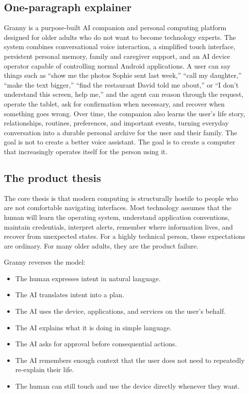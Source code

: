 \documentclass[11pt]{article}
\begin{document}
\subsection{One-paragraph explainer}
Granny is a purpose-built AI companion and personal computing platform designed for older adults who do not want to become technology experts. The system combines conversational voice interaction, a simplified touch interface, persistent personal memory, family and caregiver support, and an AI device operator capable of controlling normal Android applications. A user can say things such as ``show me the photos Sophie sent last week,'' ``call my daughter,'' ``make the text bigger,'' ``find the restaurant David told me about,'' or ``I don't understand this screen, help me,'' and the agent can reason through the request, operate the tablet, ask for confirmation when necessary, and recover when something goes wrong. Over time, the companion also learns the user's life story, relationships, routines, preferences, and important events, turning everyday conversation into a durable personal archive for the user and their family. The goal is not to create a better voice assistant. The goal is to create a computer that increasingly operates itself for the person using it.

\subsection{The product thesis}
The core thesis is that modern computing is structurally hostile to people who are not comfortable navigating interfaces. Most technology assumes that the human will learn the operating system, understand application conventions, maintain credentials, interpret alerts, remember where information lives, and recover from unexpected states. For a highly technical person, these expectations are ordinary. For many older adults, they are the product failure.

Granny reverses the model:

\begin{itemize}[leftmargin=*]
    \item The human expresses intent in natural language.
    \item The AI translates intent into a plan.
    \item The AI uses the device, applications, and services on the user's behalf.
    \item The AI explains what it is doing in simple language.
    \item The AI asks for approval before consequential actions.
    \item The AI remembers enough context that the user does not need to repeatedly re-explain their life.
    \item The human can still touch and use the device directly whenever they want.
\end{itemize}
\end{document}
